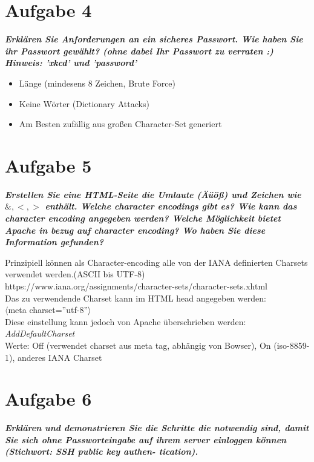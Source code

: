 \documentclass[12pt, a4paper]{report}
\begin{document}
\section*{Aufgabe 4}
\textbf{\textit{Erklären Sie Anforderungen an ein sicheres Passwort. Wie haben Sie ihr Passwort gewählt?
(ohne dabei Ihr Passwort zu verraten :) Hinweis: ’xkcd’ und ’password’}}

\begin{itemize}
	\item Länge (mindesens 8 Zeichen, Brute Force)
	\item Keine Wörter (Dictionary Attacks)
	\item Am Besten zufällig aus großen Character-Set generiert
\end{itemize}

\section*{Aufgabe 5}
\textbf{\textit{Erstellen Sie eine HTML-Seite die Umlaute (Äüöß) und Zeichen wie $\&, <, >$ enthält. Welche character encodings gibt es? Wie kann das character encoding angegeben werden?
Welche Möglichkeit bietet Apache in bezug auf character encoding? Wo haben Sie diese Information gefunden?}}

Prinzipiell können als Character-encoding alle von der IANA definierten
Charsets verwendet werden.(ASCII bis UTF-8)\\
https://www.iana.org/assignments/character-sets/character-sets.xhtml\\
Das zu verwendende Charset kann im HTML head angegeben werden:\\
$\langle$meta charset=''utf-8''$\rangle$\\
Diese einstellung kann jedoch von Apache überschrieben werden:\\
\textit{AddDefaultCharset}\\
Werte: Off (verwendet charset aus meta tag, abhängig von Bowser),
On (iso-8859-1), anderes IANA Charset



\section*{Aufgabe 6}
\textbf{\textit{Erklären und demonstrieren Sie die Schritte die notwendig sind, damit Sie sich ohne
Passworteingabe auf ihrem server einloggen können (Stichwort: SSH public key authen-
tication).}}
\end{document}
